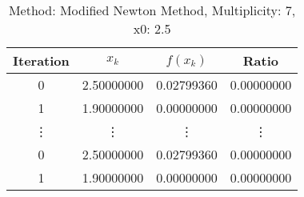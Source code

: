 \begin{table}
\centering
\caption{Method: Modified Newton Method, Multiplicity: 7, x0: 2.5}
\label{tab:table_Modified_Newton_Method_7_2_5}
\begin{tabular}{c c c c}
\toprule
Iteration &      $x_k$ &   $f(x_k)$ &      Ratio \\
\midrule
        0 & 2.50000000 & 0.02799360 & 0.00000000 \\
        1 & 1.90000000 & 0.00000000 & 0.00000000 \\
   \vdots &     \vdots &     \vdots &     \vdots \\
        0 & 2.50000000 & 0.02799360 & 0.00000000 \\
        1 & 1.90000000 & 0.00000000 & 0.00000000 \\
\bottomrule
\end{tabular}
\end{table}
